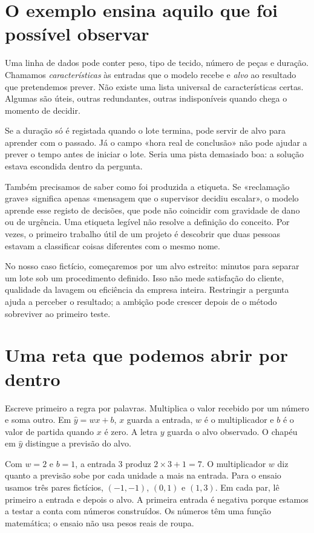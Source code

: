 \section{O exemplo ensina aquilo que foi possível observar}
Uma linha de dados pode conter peso, tipo de tecido, número de peças e duração. Chamamos \emph{características} às entradas que o modelo recebe e \emph{alvo} ao resultado que pretendemos prever. Não existe uma lista universal de características certas. Algumas são úteis, outras redundantes, outras indisponíveis quando chega o momento de decidir.

Se a duração só é registada quando o lote termina, pode servir de alvo para aprender com o passado. Já o campo «hora real de conclusão» não pode ajudar a prever o tempo antes de iniciar o lote. Seria uma pista demasiado boa: a solução estava escondida dentro da pergunta.

Também precisamos de saber como foi produzida a etiqueta. Se «reclamação grave» significa apenas «mensagem que o supervisor decidiu escalar», o modelo aprende esse registo de decisões, que pode não coincidir com gravidade de dano ou de urgência. Uma etiqueta legível não resolve a definição do conceito. Por vezes, o primeiro trabalho útil de um projeto é descobrir que duas pessoas estavam a classificar coisas diferentes com o mesmo nome.

No nosso caso fictício, começaremos por um alvo estreito: minutos para separar um lote sob um procedimento definido. Isso não mede satisfação do cliente, qualidade da lavagem ou eficiência da empresa inteira. Restringir a pergunta ajuda a perceber o resultado; a ambição pode crescer depois de o método sobreviver ao primeiro teste.

\section{Uma reta que podemos abrir por dentro}
Escreve primeiro a regra por palavras. Multiplica o valor recebido por um número e soma outro. Em $\hat y=wx+b$, $x$ guarda a entrada, $w$ é o multiplicador e $b$ é o valor de partida quando $x$ é zero. A letra $y$ guarda o alvo observado. O chapéu em $\hat y$ distingue a previsão do alvo.

Com $w=2$ e $b=1$, a entrada 3 produz $2\times3+1=7$. O multiplicador $w$ diz quanto a previsão sobe por cada unidade a mais na entrada. Para o ensaio usamos três pares fictícios, $(-1,-1)$, $(0,1)$ e $(1,3)$. Em cada par, lê primeiro a entrada e depois o alvo. A primeira entrada é negativa porque estamos a testar a conta com números construídos. Os números têm uma função matemática; o ensaio não usa pesos reais de roupa.

